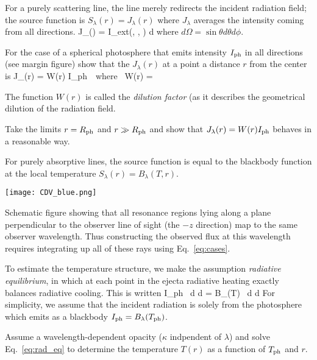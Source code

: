 \documentclass{tufte-handout}
\newcommand{\Rph}{\ensuremath{R_{\rm ph}}}
\begin{document}
 For a purely scattering line, the line merely redirects the incident radiation field; the source function is  $S_\lambda(r) = J_\lambda(r)$ where $J_\lambda$ averages the intensity coming from all directions.
\beq
J_\lambda (\lambda) =  \oint I_{\rm ext}(\lambda, \theta, \phi) d \Omega
\eeq
where $d \Omega = \sin \theta d \theta d \phi$. 

 For the case of a spherical photosphere that emits intensity $I_{\rm ph}$ in all directions (see margin figure) show that the $J_\lambda(r)$ at a point a distance $r$ from the center is 
\beq
J_\lambda(r) = W(r) I_{\rm ph}~~{\rm where~} 
W(r) =  \left[1 - \sqrt{1 - \frac{\Rph^2}{r^2}} \right]
\eeq

\pp The function $W(r)$ is called the {\it dilution factor} (as it describes the geometrical dilution of the radiation field.

 Take the limits $r = \Rph$ and $r \gg \Rph$ and show that  $J_\lambda(r) = W(r) I_{\rm ph}$ behaves in a reasonable way. 

 For purely absorptive lines, the  source function is equal to the blackbody function at the local temperature $S_\lambda(r) = B_\lambda(T,r)$.  

\begin{marginfigure}
\texttt{[image: CDV\_blue.png]}
\caption{Schematic figure showing that all resonance regions lying along a plane perpendicular
to the observer line of sight (the $-z$ direction) map to the same observer
wavelength. Thus constructing the observed flux at this wavelength requires integrating up
all of these rays using Eq.~\ref{eq:cases}.}
\end{marginfigure}


\pp To estimate the temperature structure, we  make the assumption
{\it radiative equilibrium}, in which at each point in the ejecta radiative heating exactly balances radiative cooling. This is written
\beq
 \oint \int I_{\rm ph} \kappa \rho ~d \lambda d \Omega 
= \oint \int B_\lambda(T) \kappa \rho ~d \lambda d \Omega
\label{eq:rad_eq} 
\eeq
 For simplicity, we assume that the incident radiation is solely from
the photosphere which emits as a blackbody $I_{\rm ph} = B_\lambda(T_{\rm ph})$.



 Assume a wavelength-dependent opacity ($\kappa$ indpendent of $\lambda$)
and solve Eq.~\ref{eq:rad_eq} to determine the temperature $T(r)$ as a function of $T_{\rm ph}$ and
$r$.
\end{document}
